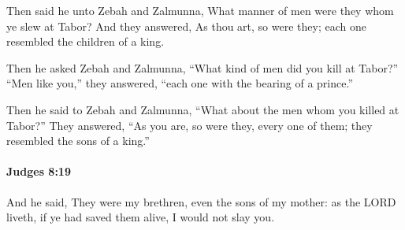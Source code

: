 			\begin{versebox}
					\item[BHS] 
					\item[ASV] Then said he unto Zebah and Zalmunna, What manner of men were they whom ye slew at Tabor? And they answered, As thou art, so were they; each one resembled the children of a king.
					\item[NIV] Then he asked Zebah and Zalmunna, “What kind of men did you kill at Tabor?” “Men like you,” they answered, “each one with the bearing of a prince.”
					\item[NRSV] Then he said to Zebah and Zalmunna, “What about the men whom you killed at Tabor?” They answered, “As you are, so were they, every one of them; they resembled the sons of a king.”
			\end{versebox}

		\paragraph{Judges 8:19} %
			\label{JUDGES-8-19}

			And he said, They were my brethren, even the sons of my mother: as the LORD liveth, if ye had saved them alive, I would not slay you.


